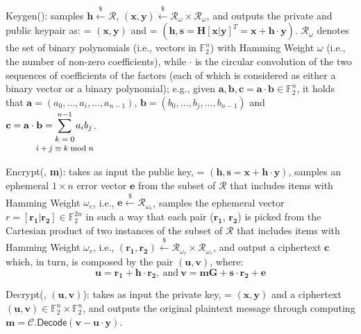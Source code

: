 \noindent \textsf{Keygen()}: samples $\mathbf{h} \xleftarrow{\mathdollar} \mathcal{R}$,  
$(\mathbf{x}, \mathbf{y}) \xleftarrow{\mathdollar} \mathcal{R}_\omega \times \mathcal{R}_\omega$, and 
outputs the private and public keypair as: \kpri = $(\mathbf{x}, \mathbf{y})$ 
and \kpub = $(\mathbf{h}, \mathbf{s} = \mathbf{H}[\mathbf{x}|\mathbf{y}]^{T} = \mathbf{x} + \mathbf{h\cdot y})$. $\mathcal{R}_\omega$ denotes the set of binary polynomials (i.e., vectors in $\mathbb{F}_2^n$) with Hamming Weight $\omega$ (i.e., the number of non-zero coefficients), while $\cdot$ is the circular convolution of the two sequences of coefficients of the factors (each of which is considered as either a binary vector or a binary polynomial); e.g., given $\mathbf{a}, \mathbf{b}, \mathbf{c}=\mathbf{a}\cdot \mathbf{b} \in \mathbb{F}_2^n$, it holds that $\mathbf{a}$$=$$(a_0, \ldots, a_i,\ldots, a_{n-1})$,  $\mathbf{b}$$=$$(b_0, \ldots, b_j,\ldots, b_{n-1})$ and $\displaystyle \mathbf{c} = \mathbf{a} \cdot \mathbf{b} = \hspace{-2.5em}\sum_{\footnotesize \begin{array}{c} k=0 \\ i+j \equiv k \bmod n\end{array}}^{n-1} \hspace{-2.5em} a_ib_j$.

\noindent \textsf{Encrypt(\kpub, \textbf{m})}: takes as input the public key, \kpub = $(\mathbf{h}, \mathbf{s} = \mathbf{x} + \mathbf{h\cdot y})$, samples an ephemeral $1 \times n$ error vector $\mathbf{e}$ from the subset of $\mathcal{R}$ that includes items with Hamming Weight $\omega_e$, i.e., $\mathbf{e} \xleftarrow{\mathdollar} \mathcal{R}_{\omega_e}$, samples the ephemeral vector $r=[\mathbf{r_1}| \mathbf{r_2}] \in \mathbb{F}_2^{2n}$ in such a way that each pair ($\mathbf{r_1}$, $\mathbf{r_2}$) is picked from the Cartesian product of two instances of the subset of $\mathcal{R}$ that includes items with Hamming Weight  $\omega_r$, i.e., $(\mathbf{r_1}, \mathbf{r_2}) \xleftarrow{\mathdollar} \mathcal{R}_{\omega_r} \times \mathcal{R}_{\omega_r}$, and output a ciphertext $\mathbf{c}$ which, in turn, is composed by the pair $(\mathbf{u}, \mathbf{v})$, where: 
$$\mathbf{u} = \mathbf{r_1} + \mathbf{h}\cdot\mathbf{r_2},\ \text{and}\ \mathbf{v} = \mathbf{mG} + \mathbf{s\cdot r_2} + \mathbf{e}$$

\noindent \textsf{Decrypt(\kpri, $(\mathbf{u}, \mathbf{v})$)}: takes as input the private key, \kpri = $(\mathbf{x}, \mathbf{y})$ and a ciphertext $(\mathbf{u}, \mathbf{v}) \in \mathbb{F}_2^n \times \mathbb{F}_2^n$, and outputs the original plaintext message through computing $\mathbf{m} = \mathcal{C}.\textsf{Decode}(\mathbf{v} - \mathbf{u\cdot y})$.

